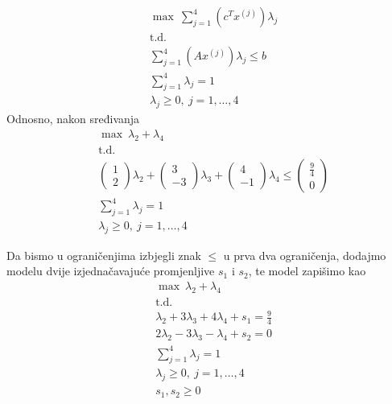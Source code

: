 \documentclass[a4paper, utf8, 11pt, colorlinks]{book}
\theoremstyle{definition}
\begin{document}
     \begin{equation}
 	\begin{aligned}\label{primjer:dw3}
 		&\max\   \sum_{j=1}^4(c^T  x^{(j)})\lambda_j\\
 		&\mbox{t.d.}\\ 
 		 &\sum_{j=1}^4 (A  x^{(j)})\lambda_j\leqslant b\\
 		&\sum_{j=1}^4\lambda_j = 1\\
 		&\lambda_j\geqslant 0,\ j = 1,\ldots,4
 	\end{aligned}
 \end{equation}
 Odnosno, nakon sređivanja 
      \begin{equation}
 	\begin{aligned}\label{primjer:dw4}
 		&\max \  \lambda_2+\lambda_4\\
 		&\mbox{t.d.}\\
 		 &\left(\begin{array}{c}
 			1\\
 			2
 		\end{array}\right)\lambda_2+\left(\begin{array}{c}
 		3\\
 		-3
 	\end{array}\right)\lambda_3+\left(\begin{array}{c}
 	4\\
 	-1
 \end{array}\right)\lambda_4\leqslant \left(\begin{array}{c}
 			\frac 9 4\\
 			0
 		\end{array}\right)\\
 		&\sum_{j=1}^4\lambda_j = 1\\
 		&\lambda_j\geqslant 0,\ j = 1,\ldots,4
 	\end{aligned}
 \end{equation}

Da bismo u ograničenjima izbjegli znak $\leqslant$ u prva dva ograničenja, dodajmo modelu dvije izjednačavajuće promjenljive $s_1$ i $s_2$, te model zapišimo kao
      \begin{equation}
	\begin{aligned}\label{primjer:dw5}
		&\max\   \lambda_2+\lambda_4\\
		&\mbox{t.d.}\\
		  &\lambda_2+3\lambda_3+4\lambda_4+s_1=\frac 94\\
		&2\lambda_2-3\lambda_3-\lambda_4+s_2=0\\
		&\sum_{j=1}^4\lambda_j = 1\\
		&\lambda_j\geqslant 0,\ j = 1,\ldots,4\\
		&s_1,s_2\geqslant 0
	\end{aligned}
\end{equation}
\end{document}
